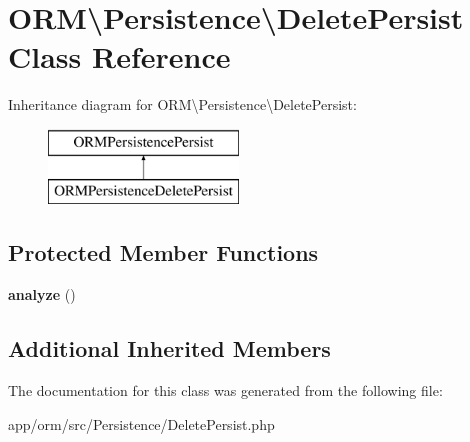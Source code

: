 \hypertarget{classORM_1_1Persistence_1_1DeletePersist}{}\section{O\+RM\textbackslash{}Persistence\textbackslash{}Delete\+Persist Class Reference}
\label{classORM_1_1Persistence_1_1DeletePersist}
Inheritance diagram for O\+RM\textbackslash{}Persistence\textbackslash{}Delete\+Persist\+:\begin{figure}[H]
\begin{center}
\leavevmode
\includegraphics[height=2.000000cm]{classORM_1_1Persistence_1_1DeletePersist}
\end{center}
\end{figure}
\subsection*{Protected Member Functions}
\begin{DoxyCompactItemize}
\item 
{\bfseries analyze} ()\hypertarget{classORM_1_1Persistence_1_1DeletePersist_ac0b22e8b50d88dac861945b437fbaaf9}{}\label{classORM_1_1Persistence_1_1DeletePersist_ac0b22e8b50d88dac861945b437fbaaf9}

\end{DoxyCompactItemize}
\subsection*{Additional Inherited Members}


The documentation for this class was generated from the following file\+:\begin{DoxyCompactItemize}
\item 
app/orm/src/\+Persistence/Delete\+Persist.\+php\end{DoxyCompactItemize}
